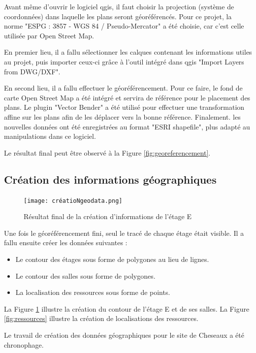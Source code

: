 \documentclass[
    iai, %
    il, %
]{heig-tb}
\begin{document}
Avant même d'ouvrir le logiciel \gls{qgis}, il faut choisir la projection (système de coordonnées) dans laquelle les plans seront géoréférencés.
Pour ce projet, la norme "ESPG : 3857 - WGS 84 / Pseudo-Mercator" a été choisie, car c'est celle utilisée par Open Street Map.

En premier lieu, il a fallu sélectionner les calques contenant les informations utiles au projet,
puis importer ceux-ci grâce à l'outil intégré dans \gls{qgis} "Import Layers from DWG/DXF".

En second lieu, il a fallu effectuer le géoréférencement.
Pour ce faire, le fond de carte Open Street Map a été intégré et servira de référence pour le placement des plans.
Le plugin "Vector Bender" a été utilisé pour effectuer une transformation affine sur les plans afin de les déplacer vers la bonne référence.
Finalement. les nouvelles données ont été enregistrées au format "ESRI shapefile", plus adapté au manipulations dans ce logiciel.

Le résultat final peut être observé à la Figure \ref{fig:georeferencement}.

\subsection{Création des informations géographiques}

\begin{figure}[h]
    \centering
    \texttt{[image: créatioNgeodata.png]}
    \caption{Résultat final de la création d'informations de l'étage E}
    \label{fig:polygones}
\end{figure}

Une fois le géoréférencement fini, seul le tracé de chaque étage était visible.
Il a fallu ensuite créer les données suivantes :

\begin{itemize}
    \item Le contour des étages sous forme de polygones au lieu de lignes.
    \item Le contour des salles sous forme de polygones.
    \item La localisation des ressources sous forme de points.
\end{itemize}

La Figure \ref{fig:polygones} illustre la création du contour de l'étage E et de ses salles.
La Figure \ref{fig:ressources} illustre la création de localisations des ressources.

Le travail de création des données géographiques pour le site de Cheseaux a été chronophage.
\end{document}
